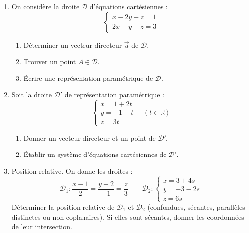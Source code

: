 \documentclass[11pt]{article}
\begin{document}
\begin{exercice}
\begin{enumerate}
    \item On considère la droite $\mathscr{D}$ d'équations cartésiennes :
    \[
    \begin{cases}
    x - 2y + z = 1 \\
    2x + y - z = 3
    \end{cases}
    \]
    \begin{enumerate}
        \item Déterminer un vecteur directeur $\vec{u}$ de $\mathscr{D}$.
        \item Trouver un point $A \in \mathscr{D}$.
        \item Écrire une représentation paramétrique de $\mathscr{D}$.
    \end{enumerate}
    
    \item Soit la droite $\mathscr{D}'$ de représentation paramétrique :
    \[
    \begin{cases}
    x = 1 + 2t \\
    y = -1 - t \\
    z = 3t
    \end{cases}
    \quad (t \in \mathbb{R})
    \]
    \begin{enumerate}
        \item Donner un vecteur directeur et un point de $\mathscr{D}'$.
        \item Établir un système d'équations cartésiennes de $\mathscr{D}'$.
    \end{enumerate}
    
    \item Position relative. On donne les droites :
    \[
    \mathscr{D}_1 : \frac{x-1}{2} = \frac{y+2}{-1} = \frac{z}{3}
    \qquad
    \mathscr{D}_2 : \begin{cases} x = 3 + 4s \\ y = -3 - 2s \\ z = 6s \end{cases}
    \]
    Déterminer la position relative de $\mathscr{D}_1$ et $\mathscr{D}_2$ (confondues, sécantes, parallèles distinctes ou non coplanaires). Si elles sont sécantes, donner les coordonnées de leur intersection.
\end{enumerate}
\end{exercice}
\end{document}
